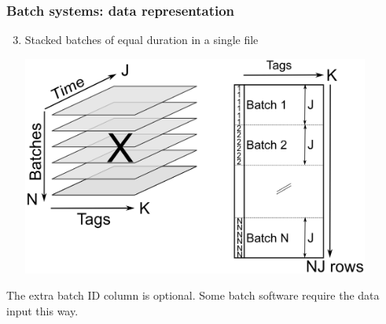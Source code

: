 \documentclass[handout, 12pt]{beamer}
\begin{document}
\begin{frame}\frametitle{Batch systems: data representation}

\begin{enumerate}
	\setcounter{enumi}{2}
	\item	Stacked batches of equal duration in a single file

			\begin{center}
				\includegraphics[width=0.9\textwidth]{images/batch-data-layers-into-page-and-unfolded-aligned}
			\end{center}
					
\end{enumerate}
The extra batch ID column is optional.  Some batch software require the data input this way.
\end{frame}
\end{document}

